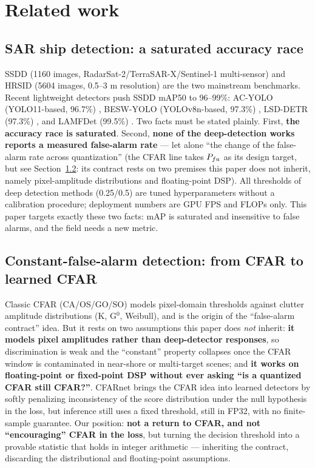 \section{Related work}
\label{sec:related}

\subsection{SAR ship detection: a saturated accuracy race}
\label{sec:rw-sar}

SSDD (1160 images, RadarSat-2/TerraSAR-X/Sentinel-1 multi-sensor) \citep{ssdd} and HRSID (5604 images, 0.5--3 m resolution) \citep{hrsid} are the two mainstream benchmarks.
Recent lightweight detectors push SSDD mAP50 to 96--99\%: AC-YOLO (YOLO11-based, 96.7\%) \citep{acyolo}, BESW-YOLO (YOLOv8n-based, 97.3\%) \citep{beswyolo}, LSD-DETR (97.3\%) \citep{lsddetr}, and LAMFDet (99.5\%) \citep{lamfdet}.
Two facts must be stated plainly.
First, \textbf{the accuracy race is saturated}.
Second, \textbf{none of the deep-detection works reports a measured false-alarm rate} --- let alone ``the change of the false-alarm rate across quantization'' (the CFAR line takes $P_{fa}$ as its design target, but see Section~\ref{sec:rw-cfar}: its contract rests on two premises this paper does not inherit, namely pixel-amplitude distributions and floating-point DSP).
All thresholds of deep detection methods (0.25/0.5) are tuned hyperparameters without a calibration procedure; deployment numbers are GPU FPS and FLOPs only.
This paper targets exactly these two facts: mAP is saturated and insensitive to false alarms, and the field needs a new metric.

\subsection{Constant-false-alarm detection: from CFAR to learned CFAR}
\label{sec:rw-cfar}

Classic CFAR (CA/OS/GO/SO) \citep{cfarclassic} models pixel-domain thresholds against clutter amplitude distributions (K, G$^0$, Weibull), and is the origin of the ``false-alarm contract'' idea.
But it rests on two assumptions this paper does \emph{not} inherit: \textbf{it models pixel amplitudes rather than deep-detector responses}, so discrimination is weak and the ``constant'' property collapses once the CFAR window is contaminated in near-shore or multi-target scenes; and \textbf{it works on floating-point or fixed-point DSP without ever asking ``is a quantized CFAR still CFAR?''}.
CFARnet \citep{cfarnet} brings the CFAR idea into learned detectors by softly penalizing inconsistency of the score distribution under the null hypothesis in the loss, but inference still uses a fixed threshold, still in FP32, with no finite-sample guarantee.
Our position: \textbf{not a return to CFAR, and not ``encouraging'' CFAR in the loss}, but turning the decision threshold into a provable statistic that holds in integer arithmetic --- inheriting the contract, discarding the distributional and floating-point assumptions.

